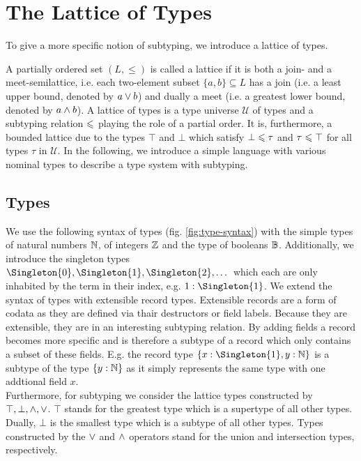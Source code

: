 \chapter{The Lattice of Types}
\label{ch:lattice}

To give a more specific notion of subtyping, we introduce a lattice of types.

A partially ordered set $(L , \leq)$ is called a lattice if it is both a join- and a meet-semilattice, i.e. each two-element subset $\{a,b\}\subseteq L$ has a join (i.e. a least upper bound, denoted by $a \vee b$) and dually a meet (i.e. a greatest lower bound, denoted by $a \wedge b$).
A lattice of types is a type universe $\mathcal{U}$ of types and a subtyping relation $\leqslant$ playing the role of a partial order.
It is, furthermore, a bounded lattice due to the types $\top$ and $\bot$ which satisfy $\bot \leqslant \tau$ and $\tau \leqslant \top$ for all types $\tau$ in $\mathcal{U}$.
In the following, we introduce a simple language with various nominal types to describe a type system with subtyping.

\section{Types}
\label{sec:types}

We use the following syntax of types (fig. \ref{fig:type-syntax}) with the simple types of natural numbers $\mathbb{N}$, of integers $\mathbb{Z}$ and the type of booleans $\mathbb{B}$.
Additionally, we introduce the singleton types $\Singleton{0}, \Singleton{1}, \Singleton{2}, \dots$ which each are only inhabited by the term in their index, e.g. $1 : \Singleton{1}$.
We extend the syntax of types with extensible record types. \cite{leijen2005extensible}
Extensible records are a form of codata as they are defined via thair destructors or field labels.
Because they are extensible, they are in an interesting subtyping relation. By adding fields a record becomes more specific and is therefore a subtype of a record which only contains a subset of these fields.
E.g. the record type $\{ x : \Singleton{1}, y : \Nat \}$ is a subtype of the type $\{ y : \mathbb{N} \}$ as it simply represents the same type with one addtional field $x$. \\
Furthermore, for subtyping we consider the lattice types constructed by $\top, \bot, \wedge, \vee$.
$\top$ stands for the greatest type which is a supertype of all other types.
Dually, $\bot$ is the smallest type which is a subtype of all other types.
Types constructed by the $\vee$ and $\wedge$ operators stand for the union and intersection types, respectively.

